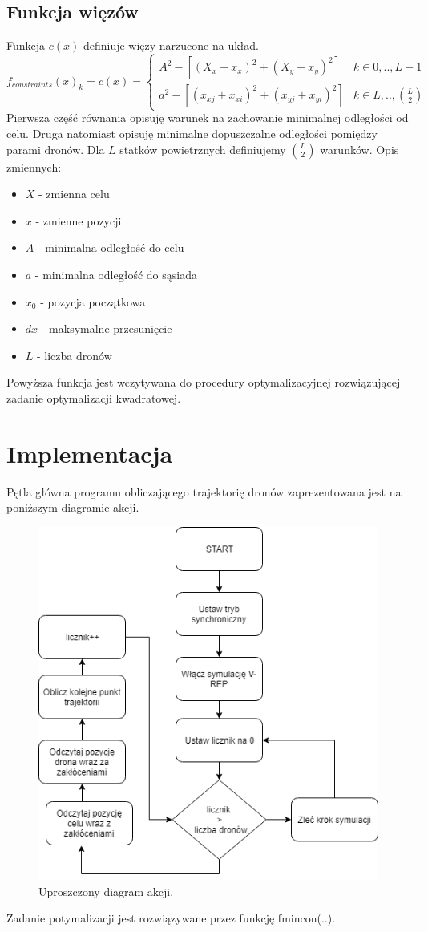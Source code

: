 \documentclass[a4paper, 11pt, oneside]{article}
\begin{document}
\subsection{Funkcja więzów} 
Funkcja $c(x)$ definiuje więzy narzucone na układ.
\[ f_{constraints}(x)_k=c(x)=\begin{cases} 
      A^2-[(X_x+x_x)^2+(X_y+x_y)^2] & k\in{ 0,..,L-1} \\
      a^2-[(x_{xj}+x_{xi})^2+(x_{yj}+x_{yi})^2] & k\in{ L,..,\binom{L}{2}} 
      
   \end{cases}
\]
Pierwsza część równania opisuję warunek na zachowanie minimalnej  odległości od celu. Druga natomiast opisuję minimalne dopuszczalne odległości pomiędzy parami dronów. Dla $L$ statków powietrznych definiujemy $\binom{L}{2}$ warunków.
Opis zmiennych:
\begin{itemize}
\item $X$ - zmienna celu
\item $x$ - zmienne pozycji
\item $A$  - minimalna odległość do celu
\item $a$ -  minimalna odległość do sąsiada
\item $x_0$ - pozycja początkowa
\item $dx$ - maksymalne przesunięcie
\item $L$ - liczba dronów
\end{itemize}
Powyższa funkcja jest wczytywana do procedury optymalizacyjnej rozwiązującej zadanie optymalizacji kwadratowej.
\section{Implementacja}
Pętla główna programu obliczającego trajektorię dronów zaprezentowana jest na poniższym diagramie akcji.
\begin{figure}[H]
\centering
\includegraphics[scale=0.5]{uproszczony_digram_akcji.png}
\caption{Uproszczony diagram akcji.}

\end{figure}
Zadanie potymalizacji jest rozwiązywane przez funkcję fmincon(..).
\end{document}
